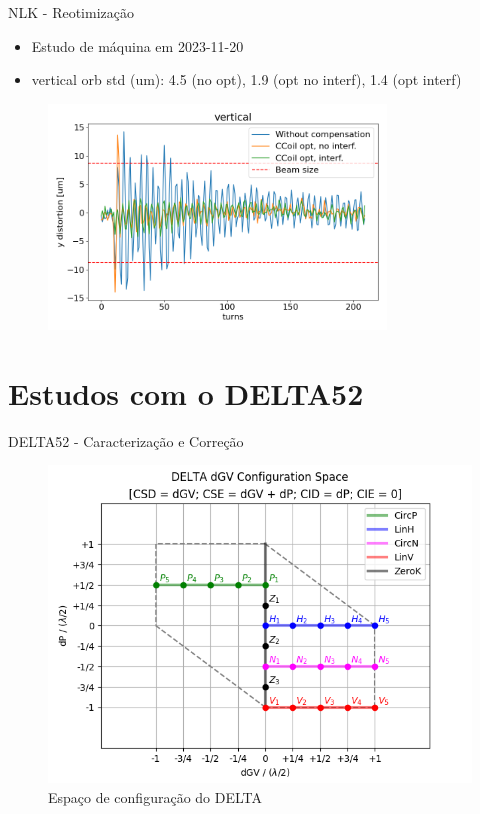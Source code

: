 \documentclass{beamer}					  %
\begin{document}
\begin{frame}{NLK - Reotimização}
    \scriptsize{\begin{itemize}
    		\item Estudo de máquina em 2023-11-20
            \item vertical orb std (um): 4.5 (no opt), 1.9 (opt no interf),  1.4 (opt interf)
    \end{itemize}}
    \begin{figure}[H]
        	\centering
            \includegraphics[width=0.8\textwidth]{2024-01-26/figures/vertical_nlk_distortion_interference.png}
            \label{fig:bba}
    \end{figure} 
\end{frame}

\section{Estudos com o DELTA52}

\begin{frame}{DELTA52 - Caracterização e Correção}
    \begin{figure}[H]
    		\centering
            \includegraphics[width=.8\textwidth]{2024-01-26/figures/id-delta-dgv-config-space.png}
            \caption{Espaço de configuração do DELTA}
            \label{fig:delta-config-space}
    \end{figure}
\end{frame}
\end{document}

